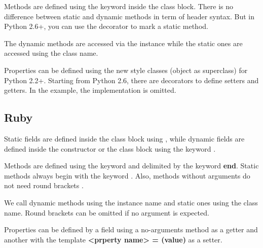 \documentclass{KodeBook}
\begin{document}


Methods are defined using the keyword  inside the class block. 
There is no difference between static and dynamic methods in term of header syntax. 
But in Python 2.6+, you can use the decorator \keyword{\@staticmethod} to mark a static method. 



The dynamic methods are accessed via the instance while the static ones are accessed using the class name.



Properties can be defined using the new style classes (object as superclass) for Python 2.2+.
Starting from Python 2.6, there are decorators to define setters and getters.
In the example, the implementation is omitted.



\subsection{Ruby}

Static fields are defined inside the class block using \keyword{\@\@}, while dynamic fields are defined inside the constructor or the class block using the keyword \keyword{\@}. 



Methods are defined using the keyword  and delimited by the keyword \textbf{end}. 
Static methods always begin with the keyword .
Also, methods without arguments do not need round brackets \keyword{()}.



We call dynamic methods using the instance name and static ones using the class name. 
Round brackets can be omitted if no argument is expected.



Properties can be defined by a field using a no-arguments method as a getter and another with the template \textbf{<prperty name> = (value)} as a setter.
\end{document}
